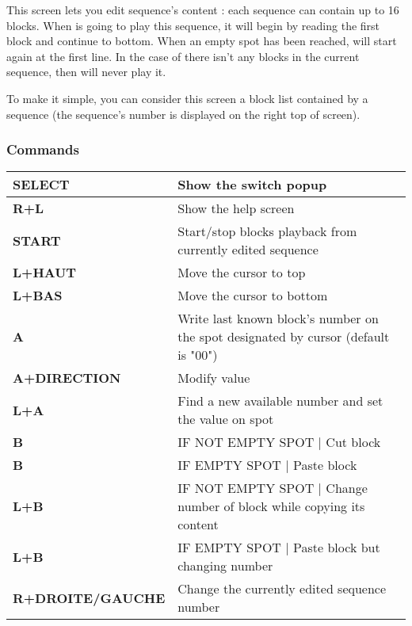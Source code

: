 This screen lets you edit sequence's content : each sequence can contain up to 16 blocks.
When \FAT is going to play this sequence, it will begin by reading the first block and continue to bottom.
When an empty spot has been reached, \FAT will start again at the first line.
In the case of there isn't any blocks in the current sequence, then \FAT will never play it.
\medskip

To make it simple, you can consider this screen a block list contained by a sequence (the sequence's number is displayed on the right top of screen).


\subsubsection{Commands}
\tablelasttail{\hline}
\begin{supertabular}{|l|p{11cm}|}
\hline
    {\bf SELECT} & Show the switch popup \\
    \hline
    {\bf R+L} & Show the help screen \\
    \hline
    {\bf START} & Start/stop blocks playback from currently edited sequence \\
    \hline
    {\bf L+HAUT} & Move the cursor to top \\
    \hline
    {\bf L+BAS} & Move the cursor to bottom \\
    \hline
    {\bf A} & Write last known block's number on the spot designated by cursor (default is "00") \\
    \hline
    {\bf A+DIRECTION} & Modify value \\
    \hline
    {\bf L+A} & Find a new available number and set the value on spot \\
    \hline
    {\bf B} & IF NOT EMPTY SPOT | Cut block \\
    \hline
    {\bf B} & IF EMPTY SPOT | Paste block \\
    \hline
    {\bf L+B} & IF NOT EMPTY SPOT | Change number of block while copying its content \\
    \hline
    {\bf L+B} & IF EMPTY SPOT | Paste block but changing number \\
    \hline
    {\bf R+DROITE/GAUCHE} & Change the currently edited sequence number \\
\hline
\end{supertabular}
